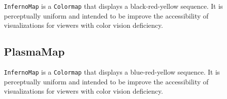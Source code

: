\texttt{InfernoMap} is a \texttt{Colormap} that displays a
black-red-yellow sequence. It is perceptually uniform and intended to be
improve the accessibility of visualizations for viewers with color
vision deficiency.

\hypertarget{plasmamap}{%
\subsection{PlasmaMap}\label{plasmamap}}

\texttt{InfernoMap} is a \texttt{Colormap} that displays a
blue-red-yellow sequence. It is perceptually uniform and intended to be
improve the accessibility of visualizations for viewers with color
vision deficiency.
